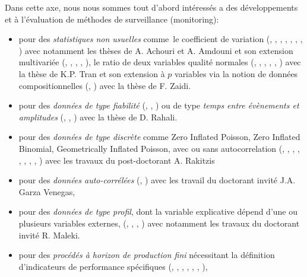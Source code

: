 Dans cette axe, nous nous sommes tout d'abord intéressés a des
développements et à l'évaluation de méthodes de surveillance
(monitoring):
\begin{itemize}
\item pour des \emph{statistiques non usuelles} comme le coefficient
  de variation (\cite{yeong:hal-01716541},
  \cite{amdouni:hal-01573597}, \cite{you:hal-01351488},
  \cite{teoh:hal-01381673}, \cite{amdouni:hal-01388503},
  \cite{castagliola:hal-01083082}, \cite{castagliola:hal-01202423},
  \cite{amdouni:hal-01202424}) avec notamment les thèses de A. Achouri
  et A. Amdouni et son extension multivariée
  (\cite{khatun:hal-02072237}, \cite{nguyen:hal-01885435},
  \cite{ginerbosch:hal-02283481}, \cite{khaw:hal-01895172},
  \cite{yeong:hal-01307037}), le ratio de deux variables qualité
  normales (\cite{tran:hal-01773342}, \cite{celano:hal-01264243},
  \cite{celano:hal-01272650}, \cite{tran:hal-01308072},
  \cite{tran:hal-01345854}, \cite{tran:hal-01396009}) avec la thèse de
  K.P. Tran et son extension à $p$ variables via la notion de données
  compositionnelles (\cite{zaidi:hal-02273060},
  \cite{tran:hal-01731361}) avec la thèse de F. Zaidi.
\item pour des \emph{données de type fiabilité}
  (\cite{haghighi:hal-02183425}, \cite{castagliola:hal-01204508},
  \cite{haghighi:hal-01264248}) ou de type \emph{temps entre
    évènements et amplitudes} (\cite{rahali:hal-02135093},
  \cite{qu:hal-01809531}, \cite{qu:hal-01895010}) avec la thèse de
  D. Rahali.
\item pour des \emph{données de type discrète} comme Zero Inflated
  Poisson, Zero Inflated Binomial, Geometrically Inflated Poisson,
  avec ou sans autocorrelation (\cite{rakitzis:hal-01718089},
  \cite{rakitzis:hal-01466793}, \cite{rakitzis:hal-01659129},
  \cite{bersimis:hal-01676808}, \cite{rakitzis:hal-01231367},
  \cite{rakitzis:hal-01331381}, \cite{rakitzis:hal-01345886},
  \cite{rakitzis:hal-01345887}, \cite{rakitzis:hal-01166916}) avec les
  travaux du post-doctorant A. Rakitzis
\item pour des \emph{données auto-corrélées}
  (\cite{garzavenegas:hal-01824643}, \cite{franco:hal-01169579}) avec
  les travail du doctorant invité J.A. Garza Venegas,
\item pour des \emph{données de type profil}, dont la variable
  explicative dépend d'une ou plusieurs variables externes,
  (\cite{maleki:hal-02183432}, \cite{maleki:hal-01870773},
  \cite{maleki:hal-01905445}, \cite{guevara:hal-01580777}) avec
  notamment les travaux du doctorant invité R. Maleki.
\item pour des \emph{procédés à horizon de production fini}
  nécessitant la définition d'indicateurs de performance spécifiques
  (\cite{chong:hal-01978750}, \cite{celano:hal-01921379},
  \cite{celano:hal-01921386}, \cite{nenes:hal-01425549},
  \cite{celano:hal-01313577}, \cite{celano:hal-01367280},
  \cite{celano:hal-01382239}),
\end{itemize}

